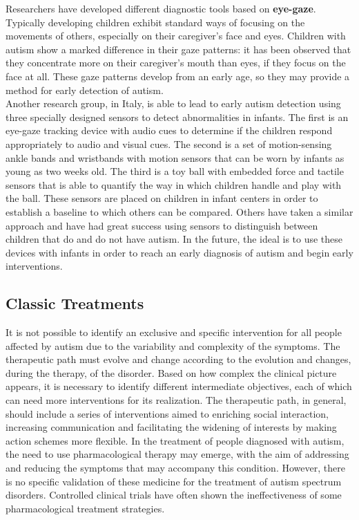 Researchers have developed different diagnostic tools based on \textbf{eye-gaze}\cite{ricks2010trends}.
Typically developing children exhibit standard ways of focusing on the movements of others, especially on their caregiver’s face and eyes. Children with autism show a marked difference in their gaze patterns: it has been observed that they concentrate more on their caregiver’s mouth than eyes, if they focus on the face at all. These gaze patterns develop from an early age, so they may provide a method for early detection of autism.\\ 
Another research group, in Italy, is able to lead to early autism detection using three specially designed sensors to detect abnormalities in infants. The first is an eye-gaze tracking device with audio cues to determine if the children respond appropriately to audio and visual cues. The second is a set of motion-sensing ankle bands and wristbands with motion sensors that can be worn by infants as young as two weeks old. The third is a toy ball with embedded force and tactile sensors that is able to quantify the way in which children
handle and play with the ball. These sensors are placed on children in infant centers in order to establish a baseline to which others can be compared.
Others have taken a similar approach and have had great success using sensors to distinguish between children that do and do not have autism. In the future, the ideal is to use these devices with infants in order to reach an early diagnosis of autism and begin early interventions. 

\subsection{Classic Treatments}
It is not possible to identify an exclusive and specific intervention for all people affected by autism due to the variability and complexity of the symptoms. The therapeutic path must evolve and change according to the evolution and changes, during the therapy, of the disorder. Based on how complex the clinical picture appears, it is necessary to identify different intermediate objectives, each of which can need more interventions for its realization.
The therapeutic path, in general, should include a series of interventions aimed to enriching social interaction, increasing communication and facilitating the widening of interests by making action schemes more flexible.
In the treatment of people diagnosed with autism, the need to use pharmacological therapy may emerge, with the aim of addressing and reducing the symptoms that may accompany this condition. However, there is no specific validation of these medicine for the treatment of autism spectrum disorders. Controlled clinical trials have often shown the ineffectiveness of some pharmacological treatment strategies.
